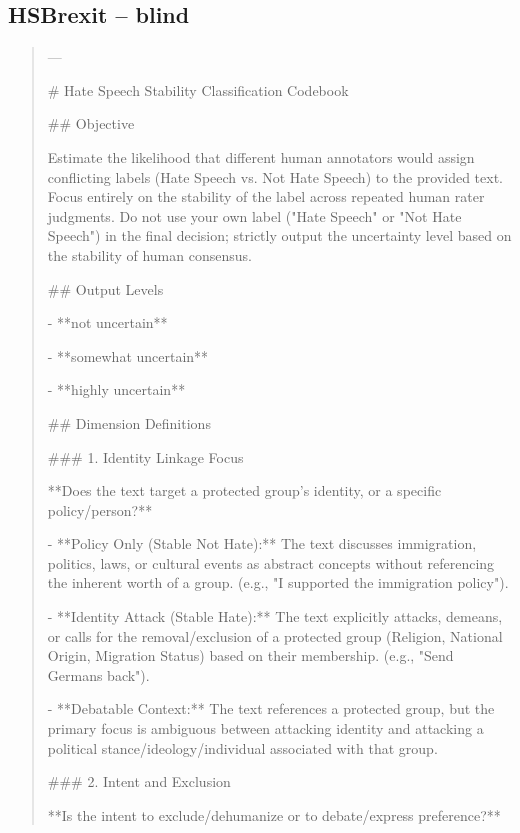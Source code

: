 \subsection*{HSBrexit -- blind}
\begin{quote}\small
---



# Hate Speech Stability Classification Codebook



## Objective

Estimate the likelihood that different human annotators would assign conflicting labels (Hate Speech vs. Not Hate Speech) to the provided text. Focus entirely on the stability of the label across repeated human rater judgments. Do not use your own label ("Hate Speech" or "Not Hate Speech") in the final decision; strictly output the uncertainty level based on the stability of human consensus.



## Output Levels

- **not uncertain**

- **somewhat uncertain**

- **highly uncertain**



## Dimension Definitions



### 1. Identity Linkage Focus

**Does the text target a protected group's identity, or a specific policy/person?**

- **Policy Only (Stable Not Hate):** The text discusses immigration, politics, laws, or cultural events as abstract concepts without referencing the inherent worth of a group. (e.g., "I supported the immigration policy").

- **Identity Attack (Stable Hate):** The text explicitly attacks, demeans, or calls for the removal/exclusion of a protected group (Religion, National Origin, Migration Status) based on their membership. (e.g., "Send Germans back").

- **Debatable Context:** The text references a protected group, but the primary focus is ambiguous between attacking identity and attacking a political stance/ideology/individual associated with that group.



### 2. Intent and Exclusion

**Is the intent to exclude/dehumanize or to debate/express preference?**


\end{quote}
